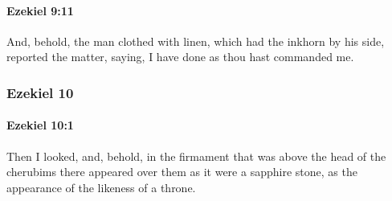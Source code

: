 		\paragraph{Ezekiel 9:11} %
			\label{EZEKIEL-9-11}

			And, behold, the man clothed with linen, which had the inkhorn by his side, reported the matter, saying, I have done as thou hast commanded me.

	\subsubsection{Ezekiel 10} %
		\label{EZEKIEL-10}

		\paragraph{Ezekiel 10:1} %
			\label{EZEKIEL-10-1}

			Then I looked, and, behold, in the firmament that was above the head of the cherubims there appeared over them as it were a sapphire stone, as the appearance of the likeness of a throne.

